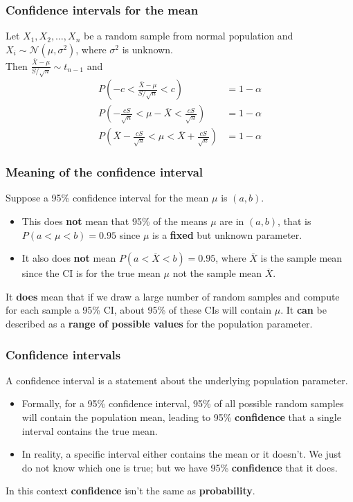 \documentclass[a4paper]{article}\usepackage[]{graphicx}\usepackage[]{xcolor}
\begin{document}
\subsubsection{Confidence intervals for the mean}
Let \( X_1,X_2,\dotsc,X_n \) be a random sample from normal population and \( X_i \sim \mathcal{N}(\mu,\sigma^2) \), where \( \sigma^2 \) is unknown.\\
Then \( \frac{\overline{X} - \mu}{S / \sqrt{n}} \sim t_{n-1} \) and
\begin{align*}
	P \left( -c < \frac{\overline{X} - \mu}{S / \sqrt{n}} < c \right) &= 1 - \alpha\\
	P \left(-\frac{cS}{\sqrt{n}} < \mu - \overline{X} < \frac{cS}{\sqrt{n}}\right) &= 1-\alpha\\
	P \left(\overline{X} - \frac{cS}{\sqrt{n}} < \mu < \overline{X} + \frac{cS}{\sqrt{n}} \right) &= 1-\alpha
\end{align*}
\subsubsection{Meaning of the confidence interval}
Suppose a 95\% confidence interval for the mean \( \mu \) is \( (a,b) \).
\begin{itemize}
	\item This \textcolor{myred}{does \textbf{not}} mean that 95\% of the means \( \mu \) are in \( (a,b) \), that is \( P(a < \mu < b) = 0.95 \) since \( \mu \) is a \textbf{fixed} but unknown parameter.
	\item It also \textcolor{myred}{does \textbf{not}} mean \( P(a < \overline{X} < b) = 0.95 \), where \( \overline{X} \) is the sample mean since the CI is for the true mean \( \mu \) not the sample mean \( \overline{X} \).
\end{itemize}
It \textcolor{myred}{\textbf{\textbf{does}}} mean that if we draw a large number of random samples and compute for each sample a 95\% CI, about 95\% of these CIs will contain \( \mu \).
It \textbf{can} be described as a \textcolor{mygreen}{\textbf{range of possible values}} for the population parameter.
\subsubsection{Confidence intervals}
A confidence interval is a statement about the underlying population parameter.
\begin{itemize}
	\item Formally, for a 95\% confidence interval, 95\% of all possible random samples will contain the population mean, leading to 95\% \textcolor{myred}{\textbf{confidence}} that a single interval contains the true mean.
	\item In reality, a specific interval either contains the mean or it doesn't. We just do not know which one is true; but we have 95\% \textcolor{myred}{\textbf{confidence}} that it does.
\end{itemize}
In this context \textcolor{myred}{\textbf{confidence}} isn't the same as \textcolor{mygreen}{\textbf{probability}}.
\end{document}
